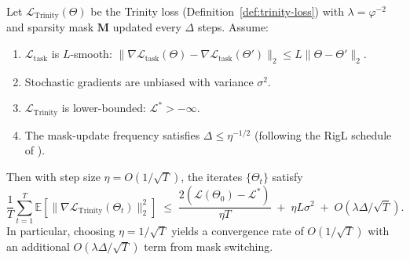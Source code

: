 \begin{theorem}
\label{thm:convergence}
Let $\mathcal{L}_{\mathrm{Trinity}}(\Theta)$ be the Trinity loss
(Definition~\ref{def:trinity-loss}) with $\lambda = \varphi^{-2}$ and sparsity
mask $\mathbf{M}$ updated every $\Delta$ steps.  Assume:
\begin{enumerate}
  \item[(A1)] $\mathcal{L}_{\mathrm{task}}$ is $L$-smooth: $\|\nabla\mathcal{L}_{\mathrm{task}}(\Theta)
    - \nabla\mathcal{L}_{\mathrm{task}}(\Theta')\|_2 \leq L\|\Theta - \Theta'\|_2$.
  \item[(A2)] Stochastic gradients are unbiased with variance $\sigma^2$.
  \item[(A3)] $\mathcal{L}_{\mathrm{Trinity}}$ is lower-bounded: $\mathcal{L}^* > -\infty$.
  \item[(A4)] The mask-update frequency satisfies $\Delta \leq \eta^{-1/2}$
    (following the RigL schedule of \cite{evci2020rigging}).
\end{enumerate}
Then with step size $\eta = O(1/\sqrt{T})$, the iterates $\{\Theta_t\}$ satisfy
\[
  \frac{1}{T}\sum_{t=1}^T \mathbb{E}\!\left[\|\nabla\mathcal{L}_{\mathrm{Trinity}}(\Theta_t)\|_2^2\right]
  \;\leq\;
  \frac{2(\mathcal{L}(\Theta_0) - \mathcal{L}^*)}{\eta T}
  \;+\;
  \eta L \sigma^2
  \;+\;
  O\!\left(\lambda \Delta / \sqrt{T}\right).
\]
In particular, choosing $\eta = 1/\sqrt{T}$ yields a convergence rate of
$O(1/\sqrt{T})$ with an additional $O(\lambda \Delta / \sqrt{T})$ term from
mask switching.
\end{theorem}

